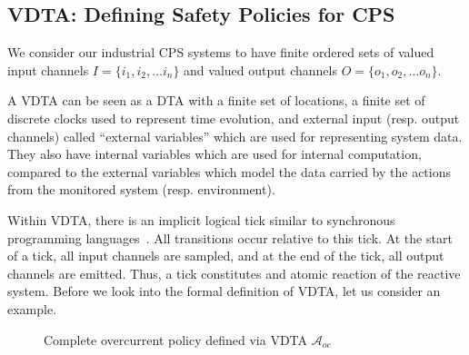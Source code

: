 
\subsection{VDTA: Defining Safety Policies for \ac{CPS}}

We consider our industrial \ac{CPS} systems to have finite ordered sets of valued input channels ${I} = \{{i_1}, {i_2}, \ldots {i_n}\}$ and valued output channels ${O} = \{{o_1}, {o_2}, \ldots {o_n}\}$.

A VDTA can be seen as a DTA with a finite set of locations, a finite set of discrete clocks used to represent time evolution, and external input (resp. output channels) called ``external variables'' which are used for representing system data.
They also have internal variables which are used for internal computation, compared to the external variables which model the data carried by the actions from the monitored system (resp. environment). 
Within \ac{VDTA}, there is an implicit logical tick similar to synchronous programming languages~\cite{SynchronousLanguages12YearsLater}.
All transitions occur relative to this tick.
At the start of a tick, all input channels are sampled, and at the end of the tick, all output channels are emitted.
Thus, a tick constitutes and atomic reaction of the reactive system.
Before we look into the formal definition of VDTA, let us consider an example.

\begin{figure}[tb]
	\centering
	
	\caption{Complete overcurrent policy defined via \ac{VDTA} $\mathcal{A}_{oc}$}
	\label{fig:vsa-overcurrent}
	\vspace{-5mm}
\end{figure}


